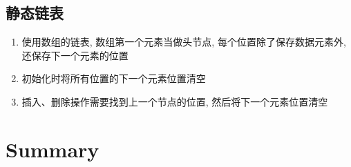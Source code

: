 \subsection{静态链表}
\begin{definition}[静态链表]
    \begin{enumerate}
        \item 使用数组的链表, 数组第一个元素当做头节点, 每个位置除了保存数据元素外, 还保存下一个元素的位置
        \item 初始化时将所有位置的下一个元素位置清空
        \item 插入、删除操作需要找到上一个节点的位置, 然后将下一个元素位置清空
    \end{enumerate}
\end{definition}
\section{Summary}
